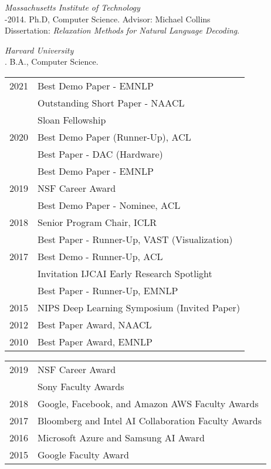 \documentclass[10pt]{article}
\begin{document}
\noindent\emph{Massachusetts Institute of Technology \vspace{0.01in}}\\
-2014.  Ph.D, Computer Science. Advisor: Michael Collins\\
\ind Dissertation: \emph{Relaxation Methods for Natural Language Decoding}. %



\medskip
\noindent\emph{Harvard University\vspace{0.02in}}\\
. B.A., Computer Science.

\bigskip


\hspace{-1cm} \begin{tabular}{lp{11.5cm}}
2021 & Best Demo Paper -  EMNLP \\
     & Outstanding Short Paper -  NAACL \\
     & Sloan Fellowship\\
2020 & Best Demo Paper (Runner-Up), ACL   \\
& Best Paper - DAC (Hardware)  \\
& Best Demo Paper - EMNLP  \\
2019 & NSF Career Award \\
& Best Demo Paper - Nominee, ACL   \\
2018 & Senior Program Chair, ICLR  \\
& Best Paper - Runner-Up, VAST (Visualization)  \\
2017 & Best Demo  - Runner-Up, ACL  \\
 & Invitation IJCAI Early Research Spotlight \\
& Best Paper - Runner-Up, EMNLP \\
2015 & NIPS Deep Learning Symposium (Invited Paper)   \\
2012 & Best Paper Award, NAACL \\
2010 & Best Paper Award, EMNLP \\
\end{tabular}



\hspace{-1cm} \begin{tabular}{lp{11.5cm}}
2019 & NSF Career Award \\
& Sony Faculty Awards \\
2018& Google, Facebook, and Amazon AWS Faculty Awards \\
2017 & Bloomberg and Intel AI Collaboration Faculty Awards \\
2016 & Microsoft Azure  and Samsung AI Award \\
2015 & Google Faculty Award \\
\end{tabular}
\pagebreak
\end{document}
